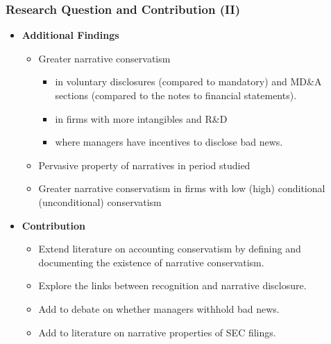 \documentclass{beamer}
\begin{document}
\begin{frame}
\frametitle{Research Question and Contribution (II)}
\begin{itemize}
	\item \textbf{Additional Findings}
	
	\begin{itemize}
		\item Greater narrative conservatism
		\begin{itemize}	
				\item  in voluntary disclosures (compared to mandatory) and MD\&A sections (compared to the notes to financial statements).
				\item in firms with more intangibles and R\&D
				\item where managers have incentives to disclose bad news. \pause
			\end{itemize}		
		\item Pervasive property of narratives in period studied \pause
		\item Greater narrative conservatism in firms with low (high) conditional (unconditional) conservatism
	\end{itemize} \pause
	

	
	\item \textbf{Contribution}
	
	\begin{itemize}
		\item Extend literature on accounting conservatism by defining and documenting the existence of narrative conservatism.
		\item Explore the links between recognition and narrative disclosure.
		\item Add to debate on whether managers withhold bad news. 
		\item Add to literature on narrative properties of SEC filings.
	\end{itemize}
\end{itemize}
\end{frame}
\end{document}
